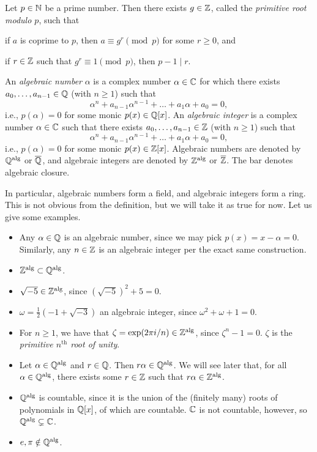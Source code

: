 \newpage
\begin{corollary} \label{cor:primitive_root}
    Let $p \in \mathbb N$ be a prime number. Then there exists $g \in \mathbb Z$, called the \textit{primitive root modulo $p$}, such that \begin{parlist}
        \item if $a$ is coprime to $p$, then $a \equiv g^r \!\! \pmod{p}$ for some $r \geq 0$, and
        \item if $r \in \mathbb Z$ such that $g^r \equiv 1 \!\! \pmod{p}$, then $p-1 \mid r$.
    \end{parlist}
\end{corollary}

\begin{definition} \label{defn:algebraic_number_and_integer}
    An \textit{algebraic number} $\alpha$ is a complex number $\alpha \in \mathbb C$ for which there exists $a_0, \dots, a_{n-1} \in \mathbb Q$ (with $n \geq 1$) such that
    \[ \alpha^n + a_{n-1} \alpha^{n-1} + \dots + a_1 \alpha + a_0 = 0, \]
    i.e., $p(\alpha) = 0$ for some monic $p(x) \in \mathbb Q[x]$. An \textit{algebraic integer} is a complex number $\alpha \in \mathbb C$ such that there exists $a_0, \dots, a_{n-1} \in \mathbb Z$ (with $n \geq 1$) such that
    \[ \alpha^n + a_{n-1} \alpha^{n-1} + \dots + a_1 \alpha + a_0 = 0, \]
    i.e., $p(\alpha) = 0$ for some monic $p(x) \in \mathbb Z[x]$. Algebraic numbers are denoted by $\mathbb Q^{\operatorname{alg}}$ or $\overline{\mathbb Q}$, and algebraic integers are denoted by $\mathbb Z^{\operatorname{alg}}$ or $\overline{\mathbb Z}$. The bar denotes algebraic closure.
\end{definition}
In particular, algebraic numbers form a field, and algebraic integers form a ring. This is not obvious from the definition, but we will take it as true for now. Let us give some examples.
\begin{itemize}
    \item Any $\alpha \in \mathbb Q$ is an algebraic number, since we may pick $p(x) = x - \alpha = 0$. Similarly, any $n \in \mathbb Z$ is an algebraic integer per the exact same construction.
    \item $\mathbb Z^{\operatorname{alg}} \subset \mathbb Q^{\operatorname{alg}}$.
    \item $\sqrt{-5} \in \mathbb Z^{\operatorname{alg}}$, since $(\sqrt{-5})^2 + 5 = 0$.
    \item $\omega = \frac{1}{2} (-1 + \sqrt{-3})$ an algebraic integer, since $\omega^2 + \omega + 1 = 0$.
    \item For $n \geq 1$, we have that $\zeta = \exp(2\pi i /n) \in \mathbb Z^{\operatorname{alg}}$, since $\zeta^n - 1 = 0$. $\zeta$ is the \textit{primitive $n^{\mathrm{th}}$ root of unity}.
    \item Let $\alpha \in \mathbb Q^{\operatorname{alg}}$ and $r \in \mathbb Q$. Then $r \alpha \in \mathbb Q^{\operatorname{alg}}$. We will see later that, for all $\alpha \in \mathbb Q^{\operatorname{alg}}$, there exists some $r \in \mathbb Z$ such that $r \alpha \in \mathbb Z^{\operatorname{alg}}$.
    \item $\mathbb Q^{\operatorname{alg}}$ is countable, since it is the union of the (finitely many) roots of polynomials in $\mathbb Q[x]$, of which are countable. $\mathbb C$ is not countable, however, so $\mathbb Q^{\operatorname{alg}} \subsetneq \mathbb C$.
    \item $e, \pi \notin \mathbb Q^{\operatorname{alg}}$.
\end{itemize}

